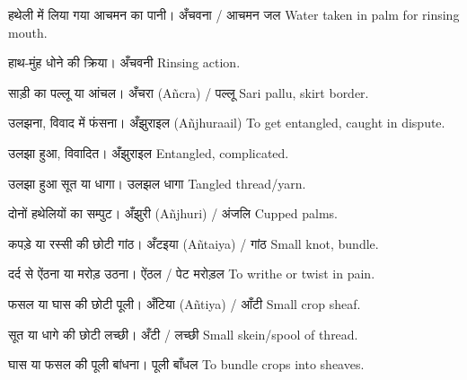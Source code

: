 %
{हथेली में लिया गया आचमन का पानी।}%
{अँचवना / आचमन जल}%
{Water taken in palm for rinsing mouth.}

%
{हाथ-मुंह धोने की क्रिया।}%
{अँचवनी}%
{Rinsing action.}

%
{साड़ी का पल्लू या आंचल।}%
{अँचरा (Añcra) / पल्लू}%
{Sari pallu, skirt border.}

%
{उलझना, विवाद में फंसना।}%
{अँझुराइल (Añjhuraail)}%
{To get entangled, caught in dispute.}

%
{उलझा हुआ, विवादित।}%
{अँझुराइल}%
{Entangled, complicated.}

%
{उलझा हुआ सूत या धागा।}%
{उलझल धागा}%
{Tangled thread/yarn.}

%
{दोनों हथेलियों का सम्पुट।}%
{अँझुरी (Añjhuri) / अंजलि}%
{Cupped palms.}

%
{कपड़े या रस्सी की छोटी गांठ।}%
{अँटइया (Añtaiya) / गांठ}%
{Small knot, bundle.}

%
{दर्द से ऐंठना या मरोड़ उठना।}%
{ऐंठल / पेट मरोड़ल}%
{To writhe or twist in pain.}

%
{फसल या घास की छोटी पूली।}%
{अँटिया (Añtiya) / आँटी}%
{Small crop sheaf.}

%
{सूत या धागे की छोटी लच्छी।}%
{अँटी / लच्छी}%
{Small skein/spool of thread.}

%
{घास या फसल की पूली बांधना।}%
{पूली बाँधल}%
{To bundle crops into sheaves.}

